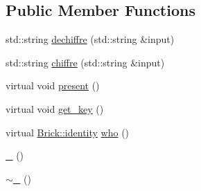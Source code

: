 \subsection*{Public Member Functions}
\begin{DoxyCompactItemize}
\item 
std\+::string \hyperlink{class__102_a998fb64410d54af6d71804811f685d09}{dechiffre} (std\+::string \&input)
\item 
std\+::string \hyperlink{class__102_a27ec62277364d81471ed4dbd72e7682b}{chiffre} (std\+::string \&input)
\item 
virtual void \hyperlink{class__102_afb7ce7c2953153f341ad5da9d3a21e9f}{present} ()
\item 
virtual void \hyperlink{class__102_a5fb39b8750033909e60a30facc3f3fe4}{get\+\_\+key} ()
\item 
virtual \hyperlink{class_brick_af32354a4d8d1275db35660a96a2cfa3e}{Brick\+::identity} \hyperlink{class__102_af9dd4029e18d0fc85f8e85ddbe29d7bd}{who} ()
\item 
\hyperlink{class__102_abde9d279babf4486332e9480d4179c5c}{\+\_} ()
\item 
\hyperlink{class__102_ab8d5c40cac7e1d262336166df96087fd}{$\sim$\+\_} ()
\end{DoxyCompactItemize}

